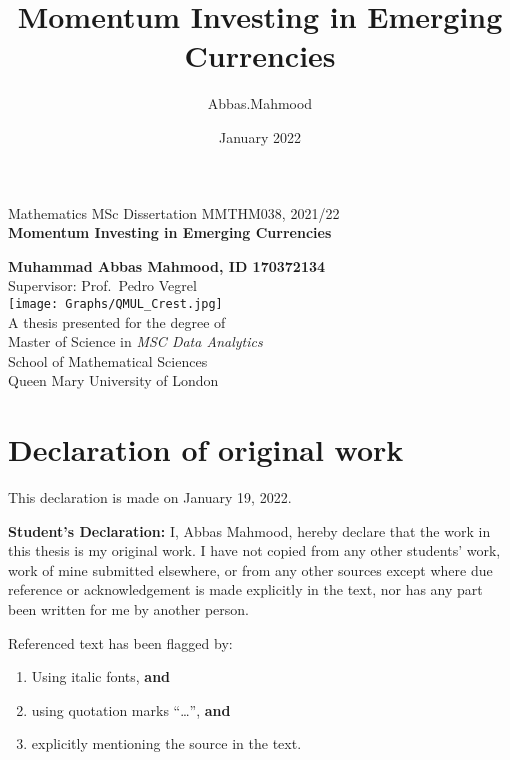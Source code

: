 \documentclass{article}
\title{Momentum Investing in Emerging Currencies}
\author{Abbas.Mahmood }
\date{January 2022}
\begin{document}
\begin{titlepage}
\begin{center}
        \vspace{-2cm}
Mathematics MSc Dissertation MMTHM038, 2021/22
		\\
        \Huge
        \textbf{Momentum Investing in Emerging Currencies}
        \\        
        \vspace{0.4cm}
   
        \vspace{0.5cm}   
        \LARGE
        \textbf{Muhammad Abbas Mahmood, ID 170372134}
        \\
        \large Supervisor: Prof.\ Pedro Vegrel
        \\
        \vspace{0.9cm}
        \texttt{[image: Graphs/QMUL\_Crest.jpg]}
        \\
        \vspace{0.9cm}        
        \LARGE 
        A thesis presented for the degree of\\
        Master of Science in \emph{MSC Data Analytics}\\
        \vspace{0.7cm}        
        \Large
        School of Mathematical Sciences\\ 
        Queen Mary University of London \\
    \end{center}
\end{titlepage}

\chapter*{Declaration of original work}
\begin{flushright}
This declaration is made on January 19, 2022.
\end{flushright}


{\bf Student's Declaration:}
I, Abbas Mahmood, hereby declare that the work in this thesis 
is my original work. I have not copied from any other students' work, work of 
mine submitted elsewhere,  or from any other sources except where due reference or acknowledgement is made explicitly in the text, nor has any part been written for me by another person.

Referenced text has been flagged by:
\begin{enumerate}
\item Using italic fonts, {\bf and} %
\item using quotation marks ``\ldots '', {\bf and}
\item explicitly mentioning the source in the text.
\end{enumerate}
\end{document}
